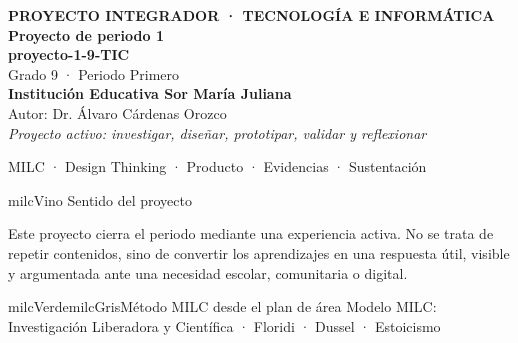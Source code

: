 \documentclass[11pt,letterpaper]{article}
\begin{document}
\thispagestyle{empty}

\vspace*{.85cm}
\begin{tcolorbox}[
  enhanced,colback=milcVino,colframe=milcVino,arc=12mm,width=.86\textwidth,
  boxrule=0pt,left=12mm,right=12mm,top=11mm,bottom=11mm,center,
  overlay={\draw[milcMagenta,line width=2pt,dash pattern=on 9pt off 8pt,rounded corners=10mm]
  ([xshift=7mm,yshift=-7mm]frame.north west) rectangle ([xshift=-7mm,yshift=7mm]frame.south east);}]
  \centering
  {\sffamily\bfseries\color{white}\fontsize{15}{17}\selectfont PROYECTO INTEGRADOR · TECNOLOGÍA E INFORMÁTICA}\\[1.0cm]
  {\sffamily\bfseries\color{white}\fontsize{30}{33}\selectfont Proyecto de periodo 1}\\[3mm]
  {\sffamily\bfseries\color{milcMostaza}\fontsize{25}{28}\selectfont proyecto-1-9-TIC}\\[8mm]
  {\sffamily\color{white}\Large Grado 9 · Periodo Primero}\\[1.0cm]
  {\sffamily\bfseries\color{white}\large Institución Educativa Sor María Juliana}\\[2mm]
  {\sffamily\color{white}Autor: Dr. Álvaro Cárdenas Orozco}\\[4mm]
  {\sffamily\itshape\color{white}Proyecto activo: investigar, diseñar, prototipar, validar y reflexionar}
\end{tcolorbox}
\vfill
\begin{tcolorbox}[enhanced,colback=milcVino!72!black,colframe=milcVino!72!black,arc=5mm,boxrule=0pt,width=.86\textwidth,left=6mm,right=6mm,top=4mm,bottom=4mm,center]
{\color{white}\sffamily\small MILC · Design Thinking · Producto · Evidencias · Sustentación}
\end{tcolorbox}

\newpage
\begin{titlebox}{milcVino}
Sentido del proyecto
\end{titlebox}
\begin{multicols}{2}
Este proyecto cierra el periodo mediante una experiencia activa. No se trata de repetir contenidos, sino de convertir los aprendizajes en una respuesta útil, visible y argumentada ante una necesidad escolar, comunitaria o digital.

\columnbreak
\begin{softbox}{milcVerde}{milcGris}{Método MILC desde el plan de área}
Modelo MILC: Investigación Liberadora y Científica · Floridi · Dussel · Estoicismo
\end{softbox}
\end{multicols}
\end{document}

